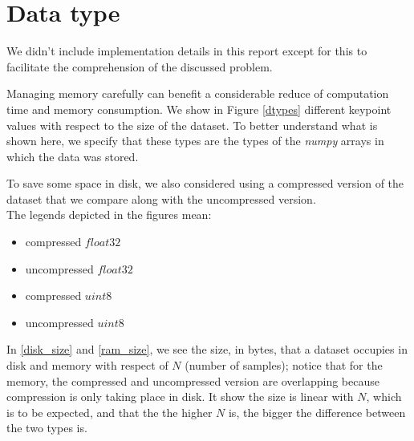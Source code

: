 \documentclass[12pt, a4paper]{report}
\begin{document}
	\chapter{Data type}\label{appendix_d}
		We didn't include implementation details in this report except for this to facilitate the comprehension of the discussed problem.
		\par
		Managing memory carefully can benefit a considerable reduce of computation time and memory consumption.
		We show in Figure \ref{dtypes} different keypoint values with respect to the size of the dataset.
		To better understand what is shown here, we specify that these types are the types of the {\itshape numpy} arrays in which the data was stored.
		\par
		To save some space in disk, we also considered using a compressed version of the dataset that we compare along with the uncompressed version. \\
		The legends depicted in the figures mean:
		\begin{itemize}[noitemsep]
			\item {} compressed $float32$
			\item {} uncompressed $float32$
			\item {} compressed $uint8$
			\item {} uncompressed $uint8$
		\end{itemize}
		In \ref{disk_size} and \ref{ram_size}, we see the size, in bytes, that a dataset occupies in disk and memory with respect of $N$ (number of samples); notice that for the memory, the compressed and uncompressed version are overlapping because compression is only taking place in disk.
		It show the size is linear with $N$, which is to be expected, and that the the higher $N$ is, the bigger the difference between the two types is.
\end{document}
